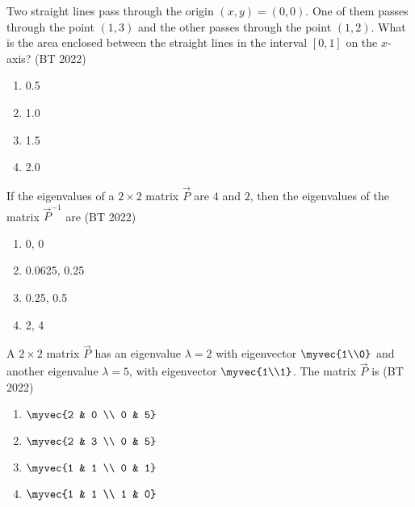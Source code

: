 \item Two straight lines pass through the origin $(x,y) = (0,0)$. One of them passes through the point $(1,3)$ and the other passes through the point $(1,2)$.  
	What is the area enclosed between the straight lines in the interval $[0,1]$ on the $x$-axis?
 \hfill{(BT 2022)}
\begin{multicols}{4}
\begin{enumerate}
    \item 0.5
    \item 1.0
    \item 1.5
    \item 2.0
\end{enumerate}
\end{multicols}
\item If the eigenvalues of a $2\times2$ matrix $\vec{P}$ are $4$ and $2$, then the eigenvalues of the matrix $\vec{P}^{-1}$ are
 \hfill{(BT 2022)}
\begin{multicols}{4}
\begin{enumerate}
    \item 0, 0
    \item 0.0625, 0.25
    \item 0.25, 0.5
    \item 2, 4
\end{enumerate}
\end{multicols}
\item A $2\times2$ matrix $\vec{P}$ has an eigenvalue $\lambda=2$ with eigenvector $\myvec{1\\0}$ and another eigenvalue $\lambda=5$, with eigenvector $\myvec{1\\1}$. The matrix $\vec{P}$ is
 \hfill{(BT 2022)}
\begin{multicols}{4}
\begin{enumerate}
    \item $\myvec{2 & 0 \\ 0 & 5}$
    \item $\myvec{2 & 3 \\ 0 & 5}$
    \item $\myvec{1 & 1 \\ 0 & 1}$
    \item $\myvec{1 & 1 \\ 1 & 0}$
\end{enumerate}
\end{multicols}
